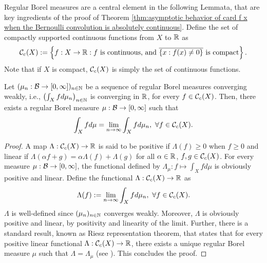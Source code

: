 Regular Borel measures are a central element in the following Lemmata, that are key ingredients of the proof of Theorem \ref{thm:asymptotic behavior of card f x when the Bernoulli convolution is absolutely continuous}. Define the set of compactly supported continuous functions from $X$ to $\mathbb{R}$ as \cite[Section 55]{halmos1950MeasureTheory}
\begin{equation}
    \mathcal{C}_c(X) := \left\{ f: X \to \mathbb{R} : f \text{ is continuous, and } \overline{\{x : f(x) \neq 0\}}\text{ is compact} \right\}.
\end{equation}
Note that if $X$ is compact, $\mathcal{C}_c(X)$ is simply the set of continuous functions. 
\begin{lemma}
    Let $(\mu_n : \mathcal{B} \to [0,\infty])_{n \in \mathbb{N}}$ be a sequence of regular Borel measures converging weakly, i.e., $\left(\int_X f d\mu_n\right)_{n \in \mathbb{N}}$ is converging in $\mathbb{R}$, for every $f \in \mathcal{C}_c(X)$. Then, there exists a regular Borel measure $\mu : \mathcal{B} \to [0,\infty]$ such that
    \begin{equation}
        \int_X f d\mu = \lim_{n\to \infty}\int_X f d\mu_n, \ \forall f \in \mathcal{C}_c(X).
    \end{equation}
\end{lemma}
\begin{proof}
    A map $\Lambda : \mathcal{C}_c(X) \to \mathbb{R}$ is said to be positive if $\Lambda(f) \geq 0$ when $f \geq 0$ and linear if $\Lambda(\alpha f + g) = \alpha \Lambda(f) + \Lambda(g)$ for all $\alpha \in \mathbb{R}$, $f,g \in \mathcal{C}_c(X)$. For every measure $\mu : \mathcal{B} \to [0,\infty]$, the functional defined by $\Lambda_\mu : f \mapsto \int_X f d\mu$ is obviously positive and linear. Define the functional $\Lambda : \mathcal{C}_c(X) \to \mathbb{R}$ as 
    \begin{equation}
        \Lambda (f) := \lim_{n\to \infty}\int_X f d\mu_n, \ \forall f \in \mathcal{C}_c(X).
    \end{equation}
    $\Lambda$ is well-defined since $(\mu_n)_{n \in \mathbb{N}}$ converges weakly. Moreover, $\Lambda$ is obviously positive and linear, by positivity and linearity of the limit. Further, there is a standard result, known as Riesz representation theorem, that states that for every positive linear functional $\Lambda : \mathcal{C}_c(X) \to \mathbb{R}$, there exists a unique regular Borel measure $\mu$ such that $\Lambda = \Lambda_\mu$ (see  \cite[Section 56, Theorems D and E]{halmos1950MeasureTheory}). This concludes the proof.
\end{proof}


